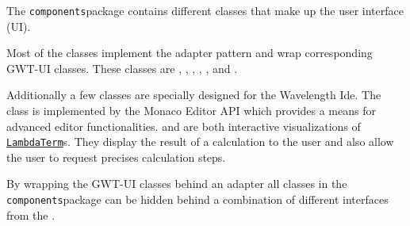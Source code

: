 The \texttt{components}package contains different classes that make up the user interface (UI).

Most of the classes implement the adapter pattern and wrap corresponding GWT-UI classes. 
These classes are \texttt{}, \texttt{}, \texttt{}, 
\texttt{}, \texttt{}, \texttt{} and \texttt{}.

Additionally a few classes are specially designed for the Wavelength Ide. The \texttt{} 
class is implemented by the Monaco Editor API which provides a means for advanced editor functionalities. 
\texttt{} and \texttt{} are both interactive visualizations of 
\texttt{\hyperref[type:edu.kit.wavelength.client.model.term.LambdaTerm]{LambdaTerm}}s. They display 
the result of a calculation to the user and also allow the user to request precises calculation steps.

By wrapping the GWT-UI classes behind an adapter all classes in the \texttt{components}package can
be hidden behind a combination of different interfaces from the \texttt{}.
